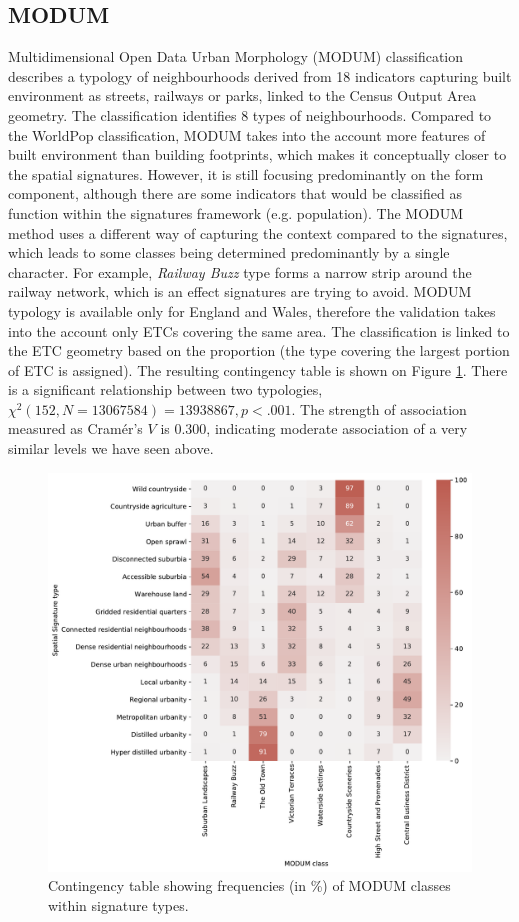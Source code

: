 \subsection*{MODUM}
Multidimensional Open Data Urban Morphology (MODUM) classification describes a typology
of neighbourhoods derived from 18 indicators capturing built environment as streets,
railways or parks, linked to the Census Output Area geometry. The classification
identifies 8 types of neighbourhoods.
Compared to the WorldPop classification, MODUM takes into the account more features of
built environment than building footprints, which makes it conceptually closer to the
spatial signatures. However, it is still focusing predominantly on the form component,
although there are some indicators that would be classified as function within the
signatures framework (e.g. population). The MODUM method uses a different way of
capturing the context compared to the signatures, which leads to some classes being
determined predominantly by a single character. For example, \textit{Railway Buzz} type
forms a narrow strip around the railway network, which is an effect signatures are
trying to avoid.
MODUM typology is available only for England and Wales, therefore the validation takes
into the account only ETCs covering the same area. The classification is linked to the
ETC geometry based on the proportion (the type covering the largest portion of ETC is
assigned). The resulting contingency table is shown on Figure \ref{fig:crosstab_modum}. There is a
significant relationship between two typologies, $\chi^{2} (152, N = 13067584) =
13938867, p < .001$. The strength of association measured as Cramér's $V$ is $0.300$,
indicating moderate association of a very similar levels we have seen above.

\begin{figure}
    \centering
    \includegraphics[width=.8\linewidth]{fig/crosstab_modum.pdf}
    \caption{Contingency table showing frequencies (in \%) of MODUM classes within signature types.}
    \label{fig:crosstab_modum}
\end{figure}

